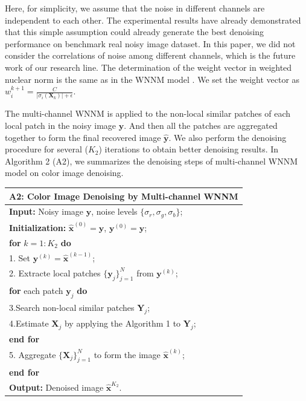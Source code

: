 \documentclass[10pt,twocolumn,letterpaper,sort&compress]{article}
\begin{document}
Here, for simplicity, we assume that the noise in different channels are independent to each other. The experimental results have already demonstrated that this simple assumption could already generate the best denoising performance on benchmark real noisy image dataset. In this paper, we did not consider the correlations of noise among different channels, which is the future work of our research line. The determination of the weight vector in weighted nuclear norm is the same as in the WNNM model \cite{wnnmijcv}. We set the weight vector as $w_{i}^{k+1}=\frac{C}{|\sigma_{i}(\mathbf{X}_{k})|+\epsilon }$. 

The multi-channel WNNM is applied to the non-local similar patches of each local patch in the noisy image $\mathbf{y}$. And then all the patches are aggregated together to form the final recovered image $\hat{\mathbf{y}}$. We also perform the denoising procedure for several ($K_{2}$) iterations to obtain better denoising results. In Algorithm 2 (A2), we summarizes the  denoising steps of multi-channel WNNM model on color image denoising.
\begin{table}\label{alg1}
\begin{tabular}{l}
\hline
\textbf{A2}: Color Image Denoising by Multi-channel WNNM
\\
\hline
\textbf{Input:} Noisy image $\mathbf{y}$, noise levels $\{\sigma_{r}, \sigma_{g}, \sigma_{b}\}$;
\\
\textbf{Initialization:} $\hat{\mathbf{x}}^{(0)}=\mathbf{y}$, $\mathbf{y}^{(0)}=\mathbf{y}$;
\\
\textbf{for} $k = 1:K_{2}$ \textbf{do}
\\
1. Set $\mathbf{y}^{(k)}=\hat{\mathbf{x}}^{(k-1)}$;
\\
2. Extracte local patches $\{\mathbf{y}_{j}\}_{j=1}^{N}$ from $\mathbf{y}^{(k)}$;
\\
\quad\textbf{for} each patch $\mathbf{y}_{j}$ \textbf{do}
\\
3.\quad Search non-local similar patches $\mathbf{Y}_{j}$;
\\
4.\quad Estimate $\mathbf{X}_{j}$ by applying the Algorithm 1 to $\mathbf{Y}_{j}$;
\\
\quad\textbf{end for}
\\
5. Aggregate $\{\mathbf{X}_{j}\}_{j=1}^{N}$ to form the image $\hat{\mathbf{x}}^{(k)}$;
\\
\textbf{end for}
\\
\textbf{Output:} Denoised image $\hat{\mathbf{x}}^{K_{2}}$.
\\
\hline
\end{tabular}
\end{table}
\end{document}
